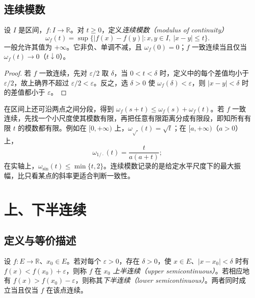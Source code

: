 \subsection{连续模数}

\begin{definition}
设 $I$ 是区间，$f:I\to\mathbb R$。对 $t\ge0$，定义\emph{连续模数（modulus of continuity）}
\begin{equation}
\label{eq:pei-modulus}
\omega_f(t)=\sup\{|f(x)-f(y)|:x,y\in I,\ |x-y|\le t\}.
\end{equation}
一般允许其值为 $+\infty$。它非负、单调不减，且 $\omega_f(0)=0$；$f$ 一致连续当且仅当 $\omega_f(t)\to0$（$t\downarrow0$）。
\end{definition}

\begin{proof}
若 $f$ 一致连续，先对 $\varepsilon/2$ 取 $\delta$，当 $0<t<\delta$ 时，定义中的每个差值均小于 $\varepsilon/2$，故上确界不超过 $\varepsilon/2<\varepsilon$。反之，选 $\delta>0$ 使 $\omega_f(\delta)<\varepsilon$，则 $|x-y|<\delta$ 时的差值都小于 $\varepsilon$。
\end{proof}

在区间上还可沿两点之间分段，得到 $\omega_f(s+t)\le\omega_f(s)+\omega_f(t)$。若 $f$ 一致连续，先找一个小尺度使其模数有限，再把任意有限距离分成有限段，即知所有有限 $t$ 的模数都有限。例如在 $[0,+\infty)$ 上，$\omega_{\sqrt{\cdot}}(t)=\sqrt t$；在 $[a,+\infty)$（$a>0$）上，
\[
\omega_{1/\cdot}(t)=\frac{t}{a(a+t)};
\]
在实轴上，$\omega_{\sin}(t)\le\min\{t,2\}$。连续模数记录的是给定水平尺度下的最大振幅，比只看某点的斜率更适合判断一致性。

\section{上、下半连续}
\label{sec:pei-semicontinuity}

\subsection{定义与等价描述}

\begin{definition}
设 $f:E\to\mathbb R$、$x_0\in E$。若对每个 $\varepsilon>0$，存在 $\delta>0$，使 $x\in E$、$|x-x_0|<\delta$ 时有 $f(x)<f(x_0)+\varepsilon$，则称 $f$ 在 $x_0$ \emph{上半连续（upper semicontinuous）}。若相应地有 $f(x)>f(x_0)-\varepsilon$，则称其\emph{下半连续（lower semicontinuous）}。两者同时成立当且仅当 $f$ 在该点连续。
\end{definition}

